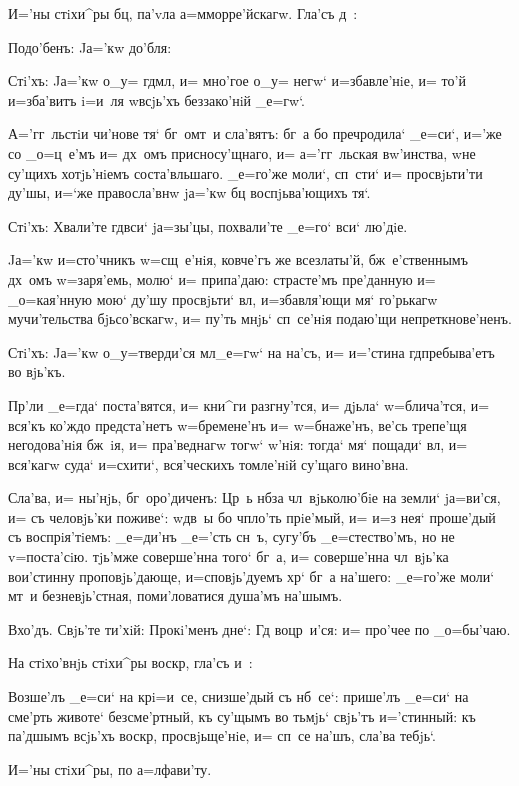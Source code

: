 И='ны стiхи^ры бц, па'vла а=мморре'йскагw. Гла'съ 
д~:

Подо'бенъ: Jа='кw до'бля:

Стi'хъ: Jа='кw о_у= гд мл, и= мно'гое о_у= 
негw` и=збавле'нiе, и= то'й и=зба'витъ i=и~ля w\т всjь'хъ 
беззако'нiй _е=гw`.

А='гг~льстiи чи'нове тя` бг~омт~и сла'вятъ: бг~а бо 
преч родила` _е=си`, и='же со _о=ц~е'мъ и= дх~омъ 
присносу'щнаго, и= а='гг~льская вw'инства, w\т не су'щихъ 
хотjь'нiемъ соста'вльшаго. _е=го'же моли`, сп~сти` и= 
просвjьти'ти ду'шы, и=`же правосла'внw jа='кw бц 
воспjьва'ющихъ тя`.

Стi'хъ: Хвали'те гд вси` jа=зы'цы, похвали'те 
_е=го` вси` лю'дiе.

Jа='кw и=сто'чникъ w=сщ~е'нiя, ковче'гъ же всезлаты'й, 
бж~е'ственнымъ дх~омъ w=заря'емь, молю` и= припа'даю: 
страсте'мъ пре'данную и= _о=кая'нную мою` ду'шу 
просвjьти` вл, и=збавля'ющи мя` го'рькагw 
мучи'тельства бjьсо'вскагw, и= пу'ть мнjь` сп~се'нiя 
подаю'щи непреткнове'ненъ.

Стi'хъ: Jа='кw о_у=тверди'ся мл _е=гw` на на'съ, 
и= и='стина гд пребыва'етъ во вjь'къ.

Пр'ли _е=гда` поста'вятся, и= кни^ги разгну'тся, 
и= дjьла` w=блича'тся, и= вся'къ ко'ждо предста'нетъ 
w=бремене'нъ и= w=бнаже'нъ, ве'сь трепе'щя негодова'нiя 
бж~iя, и= пра'веднагw тогw` w'нiя: тогда` мя` 
пощади` вл, и= вся'кагw суда` и=схити`, вся'ческихъ 
томле'нiй су'щаго вино'вна.

Сла'ва, и= ны'нjь, бг~оро'диченъ: Цр~ь нб за 
чл~вjьколю'бiе на земли` jа=ви'ся, и= съ человjь'ки 
поживе`: w\т дв~ы бо ч пло'ть прiе'мый, и= и=з\ъ 
нея` проше'дый съ воспрiя'тiемъ: _е=ди'нъ _е='сть сн~ъ, 
сугу'бъ _е=стество'мъ, но не v=поста'сiю. тjь'мже 
соверше'нна того` бг~а, и= соверше'нна чл~вjь'ка 
вои'стинну проповjь'дающе, и=сповjь'дуемъ хр` бг~а 
на'шего: _е=го'же моли` мт~и безневjь'стная, 
поми'ловатися душа'мъ на'шымъ.

Вхо'дъ. Свjь'те ти'хiй: Прокi'менъ дне`: Гд 
воцр~и'ся: и= про'чее по _о=бы'чаю.

На стiхо'внjь стiхи^ры воскр, гла'съ и~:

Возше'лъ _е=си` на кр i=и~се, снизше'дый съ 
нб~се`: прише'лъ _е=си` на сме'рть животе` безсме'ртный, 
къ су'щымъ во тьмjь` свjь'тъ и='стинный: къ па'дшымъ 
всjь'хъ воскр, просвjьще'нiе, и= сп~се на'шъ, сла'ва 
тебjь`.

И='ны стiхи^ры, по а=лфави'ту.


